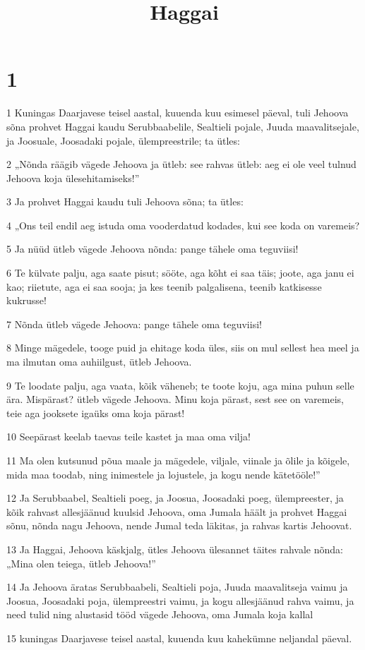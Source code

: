 

\title{Haggai}

\chapter{1}

\par 1 Kuningas Daarjavese teisel aastal, kuuenda kuu esimesel päeval, tuli Jehoova sõna prohvet Haggai kaudu Serubbaabelile, Sealtieli pojale, Juuda maavalitsejale, ja Joosuale, Joosadaki pojale, ülempreestrile; ta ütles:
\par 2 „Nõnda räägib vägede Jehoova ja ütleb: see rahvas ütleb: aeg ei ole veel tulnud Jehoova koja ülesehitamiseks!”
\par 3 Ja prohvet Haggai kaudu tuli Jehoova sõna; ta ütles:
\par 4 „Ons teil endil aeg istuda oma vooderdatud kodades, kui see koda on varemeis?
\par 5 Ja nüüd ütleb vägede Jehoova nõnda: pange tähele oma teguviisi!
\par 6 Te külvate palju, aga saate pisut; sööte, aga kõht ei saa täis; joote, aga janu ei kao; riietute, aga ei saa sooja; ja kes teenib palgalisena, teenib katkisesse kukrusse!
\par 7 Nõnda ütleb vägede Jehoova: pange tähele oma teguviisi!
\par 8 Minge mägedele, tooge puid ja ehitage koda üles, siis on mul sellest hea meel ja ma ilmutan oma auhiilgust, ütleb Jehoova.
\par 9 Te loodate palju, aga vaata, kõik väheneb; te toote koju, aga mina puhun selle ära. Mispärast? ütleb vägede Jehoova. Minu koja pärast, sest see on varemeis, teie aga jooksete igaüks oma koja pärast!
\par 10 Seepärast keelab taevas teile kastet ja maa oma vilja!
\par 11 Ma olen kutsunud põua maale ja mägedele, viljale, viinale ja õlile ja kõigele, mida maa toodab, ning inimestele ja lojustele, ja kogu nende kätetööle!”
\par 12 Ja Serubbaabel, Sealtieli poeg, ja Joosua, Joosadaki poeg, ülempreester, ja kõik rahvast allesjäänud kuulsid Jehoova, oma Jumala häält ja prohvet Haggai sõnu, nõnda nagu Jehoova, nende Jumal teda läkitas, ja rahvas kartis Jehoovat.
\par 13 Ja Haggai, Jehoova käskjalg, ütles Jehoova ülesannet täites rahvale nõnda: „Mina olen teiega, ütleb Jehoova!”
\par 14 Ja Jehoova äratas Serubbaabeli, Sealtieli poja, Juuda maavalitseja vaimu ja Joosua, Joosadaki poja, ülempreestri vaimu, ja kogu allesjäänud rahva vaimu, ja need tulid ning alustasid tööd vägede Jehoova, oma Jumala koja kallal
\par 15 kuningas Daarjavese teisel aastal, kuuenda kuu kahekümne neljandal päeval.



